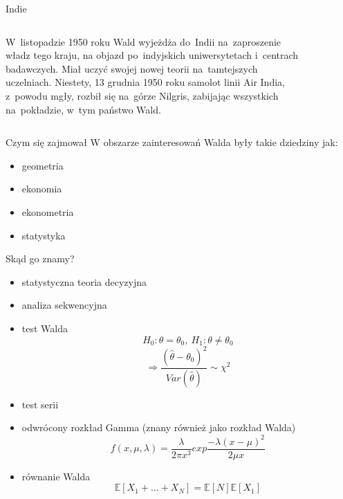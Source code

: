 \documentclass[11pt,pdftex,mathserif]{beamer}\usepackage[]{graphicx}\usepackage[]{color}
\theoremstyle{definition}
\newcommand{\E}{\mathbb{E}}
\begin{document}
\begin{frame}{Indie}
\begin{columns}
  \begin{column}{0.49\textwidth}
W~listopadzie 1950 roku Wald wyjeżdża do~Indii na~zaproszenie władz tego kraju, na objazd po~indyjskich uniwersytetach i~centrach badawczych. Miał uczyć swojej nowej teorii na~tamtejszych uczelniach. Niestety, 13 grudnia 1950 roku samolot linii Air India, z~powodu mgły, rozbił się na~górze Nilgris, zabijając wszystkich na~pokładzie, w~tym państwo Wald.
  \end{column}
  \begin{column}{0.49\textwidth}
  \begin{figure}
    \includegraphics[width=5cm]{wald1.jpg}
  \end{figure}
\end{column}
\end{columns}
\end{frame}



\begin{frame}{Czym się zajmował}
W obszarze zainteresowań Walda były takie dziedziny jak:
\begin{itemize}
\item geometria
\item ekonomia
\item ekonometria
\item statystyka
\end{itemize}
\end{frame}



\begin{frame}{Skąd go znamy?}
\begin{itemize}
\item statystyczna teoria decyzyjna
\item analiza sekwencyjna
\item test Walda $$H_0: \theta = \theta_0,\ H_1: \theta \neq \theta_0 $$ $$\Rightarrow \frac{(\widehat{\theta} - \theta_0)^2}{Var(\widehat{\theta})} \sim \chi^2 $$
\item test serii 
\item odwrócony rozkład Gamma (znany również jako rozkład Walda) $$ f(x,\mu,\lambda) = \frac{\lambda}{2\pi x^3}exp\frac{-\lambda(x-\mu)^2}{2\mu x} $$
\item równanie Walda $$\E[X_1 + \ldots + X_N] = \E[N]\E[X_1]$$
\end{itemize}
\end{frame}
\end{document}
